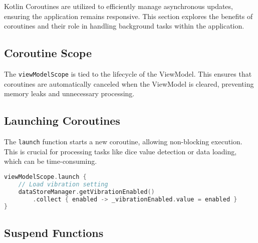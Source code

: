 Kotlin Coroutines are utilized to efficiently manage asynchronous updates, ensuring the application remains responsive. This section explores the benefits of coroutines and their role in handling background tasks within the application.

\subsection{Coroutine Scope}

The \texttt{viewModelScope} is tied to the lifecycle of the ViewModel. This ensures that coroutines are automatically canceled when the ViewModel is cleared, preventing memory leaks and unnecessary processing.

\begin{figure}[ht!]
    \centering
\end{figure} 
\label{fig:lifecycle_viewmodelscope}

\subsection{Launching Coroutines}

The \texttt{launch} function starts a new coroutine, allowing non-blocking execution. This is crucial for processing tasks like dice value detection or data loading, which can be time-consuming.
\begin{lstlisting}[language=Kotlin, caption={Launching a Coroutine}, label=lst:launch_coroutine]
viewModelScope.launch {
    // Load vibration setting
    dataStoreManager.getVibrationEnabled()
        .collect { enabled -> _vibrationEnabled.value = enabled }
}
\end{lstlisting}

\subsection{Suspend Functions}

